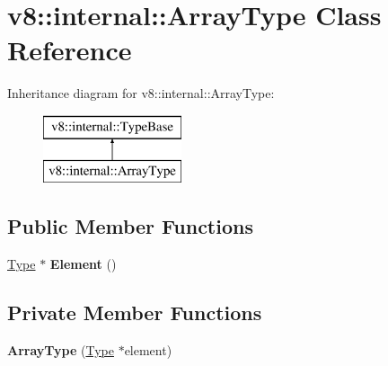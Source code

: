 \hypertarget{classv8_1_1internal_1_1_array_type}{}\section{v8\+:\+:internal\+:\+:Array\+Type Class Reference}
\label{classv8_1_1internal_1_1_array_type}
Inheritance diagram for v8\+:\+:internal\+:\+:Array\+Type\+:\begin{figure}[H]
\begin{center}
\leavevmode
\includegraphics[height=2.000000cm]{classv8_1_1internal_1_1_array_type}
\end{center}
\end{figure}
\subsection*{Public Member Functions}
\begin{DoxyCompactItemize}
\item 
\hyperlink{classv8_1_1internal_1_1_type}{Type} $\ast$ {\bfseries Element} ()\hypertarget{classv8_1_1internal_1_1_array_type_a5a726d70ed18474e64e6cf705f39ad4d}{}\label{classv8_1_1internal_1_1_array_type_a5a726d70ed18474e64e6cf705f39ad4d}

\end{DoxyCompactItemize}
\subsection*{Private Member Functions}
\begin{DoxyCompactItemize}
\item 
{\bfseries Array\+Type} (\hyperlink{classv8_1_1internal_1_1_type}{Type} $\ast$element)\hypertarget{classv8_1_1internal_1_1_array_type_a0f06e57f3c85a0089b6496025ff4abf5}{}\label{classv8_1_1internal_1_1_array_type_a0f06e57f3c85a0089b6496025ff4abf5}

\end{DoxyCompactItemize}

